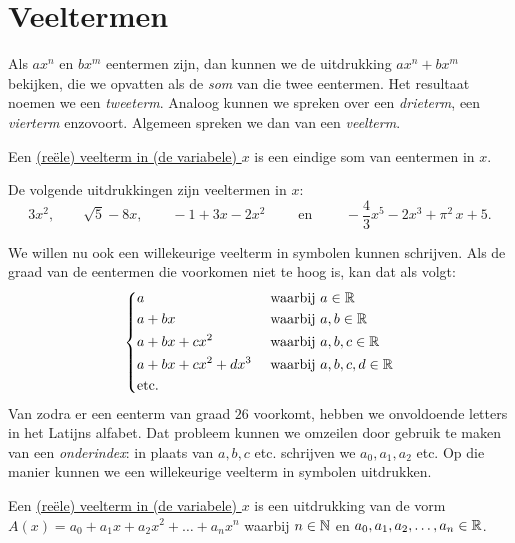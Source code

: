 \documentclass{ximera}
\begin{document}
	\author{Koen De Naeghel}
	\label{xim:veeltermen_veeltermen}


\section{Veeltermen}

Als $ax^n$ en $bx^m$ eentermen zijn, dan kunnen we de uitdrukking $ax^n + bx^m$ bekijken, die we opvatten als de {\em som} van die twee eentermen. Het resultaat noemen we een {\em tweeterm}. Analoog kunnen we spreken over een {\em drieterm}, een {\em vierterm} enzovoort. Algemeen spreken we dan van een {\em veelterm}.

\begin{definition}[in woorden]
Een \underline{(re\"ele) veelterm in (de variabele) $x$} is een eindige som van eentermen in $x$.
\end{definition}

\begin{example}
De volgende uitdrukkingen zijn veeltermen in $x$:
\[
3x^2, \qquad \sqrt{5} - 8x, \qquad -1 + 3x -2x^2 \qquad \text{ en } \qquad -\frac{4}{3}x^5 - 2x^3 + \pi^2\,x + 5. 
\]
\end{example}

We willen nu ook een willekeurige veelterm in symbolen kunnen schrijven. Als de graad van de eentermen die voorkomen niet te hoog is, kan dat als volgt:
\begin{align*} 
\left\{
\begin{aligned}
& a && \text{ waarbij } a \in \mathbb{R}  \\
& a + bx && \text{ waarbij } a,b \in \mathbb{R}  \\
& a + bx + cx^2 && \text{ waarbij } a,b,c \in \mathbb{R}  \\
& a + bx + cx^2 + dx^3 && \text{ waarbij } a,b,c,d \in \mathbb{R} \\
& \text{etc.} && 
\end{aligned}
\right.
\end{align*}
Van zodra er een eenterm van graad $26$ voorkomt, hebben we onvoldoende letters in het Latijns alfabet. Dat probleem kunnen we omzeilen door gebruik te maken van een {\em onderindex}\:: in plaats van $a,b,c$ etc. schrijven we $a_0, a_1, a_2$ etc. Op die manier kunnen we een willekeurige veelterm in symbolen uitdrukken.

\begin{definition}[in symbolen]
Een \underline{(re\"ele) veelterm in (de variabele) $x$} is een uitdrukking van de vorm $A(x) = a_0 + a_1x + a_2x^2 + \dots + a_n x^n$ waarbij $n \in \mathbb{N}$ en $a_0,a_1,a_2,\ldots,a_n \in \mathbb{R}$.
\end{definition}
\end{document}
